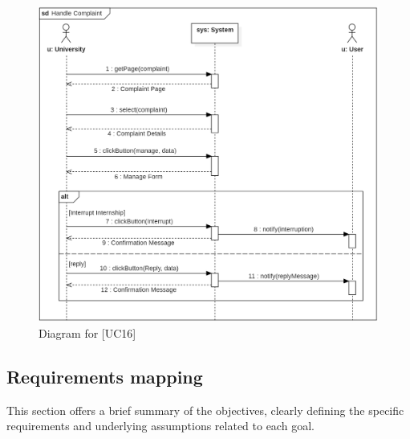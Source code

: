 \begin{figure} [H]
    \centering
    \includegraphics[width=1\linewidth]{Use Cases Images/handle_complaint.png}
    \caption{Diagram for [UC16]}
    \label{fig: Handle Complaint Diagram}
\end{figure}

\newpage
\subsection{Requirements mapping}

This section offers a brief summary of the objectives, clearly defining the specific requirements and underlying assumptions related to each goal.

